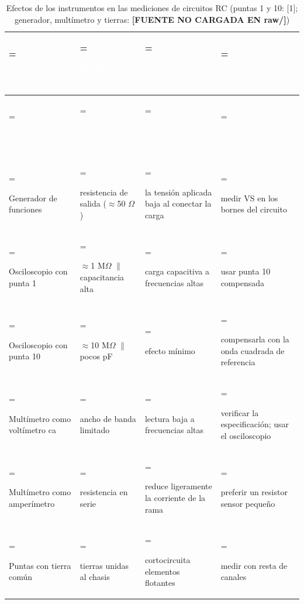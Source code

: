 \documentclass[11pt,letterpaper]{article}
\begin{document}
\begin{xltabular}{\linewidth}{>{\hsize\linewidth=\hsize\raggedright\arraybackslash}X>{\hsize\linewidth=\hsize\raggedright\arraybackslash}X>{\hsize\linewidth=\hsize\raggedright\arraybackslash}X>{\hsize\linewidth=\hsize\raggedright\arraybackslash}X}
\caption{Efectos de los instrumentos en las mediciones de circuitos RC (puntas \texttimes{}1 y \texttimes{}10: [1]; generador, multímetro y tierras: \textcolor{iuborange}{\textbf{[FUENTE NO CARGADA EN raw/]}})} \\
 \textcolor{white}{\textbf{Instrumento}} & \textcolor{white}{\textbf{Parámetro interno}} & \textcolor{white}{\textbf{Efecto sobre la medición}} & \textcolor{white}{\textbf{Cómo reducirlo}} \\
\endfirsthead
{} \textcolor{white}{\textbf{Instrumento}} & \textcolor{white}{\textbf{Parámetro interno}} & \textcolor{white}{\textbf{Efecto sobre la medición}} & \textcolor{white}{\textbf{Cómo reducirlo}} \\
\endhead
\bottomrule
\endlastfoot
  Generador de funciones & resistencia de salida (\ensuremath{\approx}50 \ensuremath{\Omega}) & la tensión aplicada baja al conectar la carga & medir VS en los bornes del circuito \\
   Osciloscopio con punta \texttimes{}1 & \ensuremath{\approx}1 M\ensuremath{\Omega} \ensuremath{\parallel} capacitancia alta & carga capacitiva a frecuencias altas & usar punta \texttimes{}10 compensada \\
  Osciloscopio con punta \texttimes{}10 & \ensuremath{\approx}10 M\ensuremath{\Omega} \ensuremath{\parallel} pocos pF & efecto mínimo & compensarla con la onda cuadrada de referencia \\
   Multímetro como voltímetro ca & ancho de banda limitado & lectura baja a frecuencias altas & verificar la especificación; usar el osciloscopio \\
  Multímetro como amperímetro & resistencia en serie & reduce ligeramente la corriente de la rama & preferir un resistor sensor pequeño \\
   Puntas con tierra común & tierras unidas al chasis & cortocircuita elementos flotantes & medir con resta de canales \\
\end{xltabular}
\end{document}
